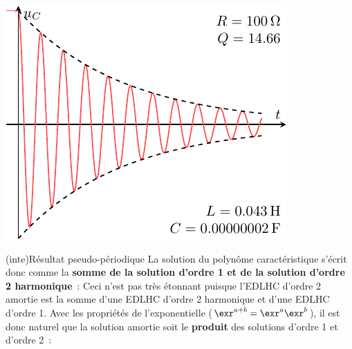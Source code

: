 \documentclass[../../main/main.tex]{subfiles}
\begin{document}
\begin{tcb*}[label=prop:solupseudoper, sidebyside, righthand ratio=.3]
\begin{center}
{			\includegraphics[width=\linewidth]{carac-rlc-15}
		}%
	\end{center}
\end{tcb*}

\begin{tcb*}[breakable](inte){Résultat pseudo-périodique}
	La solution du polynôme caractéristique s'écrit donc comme la \textbf{somme
		de la solution d'ordre 1 et de la solution d'ordre 2 harmonique}~:
	Ceci n'est pas très étonnant puisque l'EDLHC d'ordre 2 amortie est la somme
	d'une EDLHC d'ordre 2 harmonique et d'une EDLHC d'ordre 1.
	\tcblower
	Avec les propriétés de l'exponentielle ($\exr^{a+b} = \exr^{a}\exr^{b}$), il
	est donc naturel que la solution amortie soit le \textbf{produit} des
	solutions d'ordre 1 et d'ordre 2~:
	\vspace{-15pt}
\end{tcb*}
\end{document}
